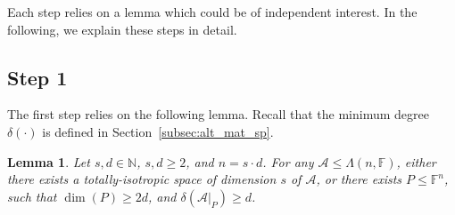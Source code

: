 \documentclass[10pt]{article}
\newtheorem{lemma}[theorem]{Lemma}
\newcommand{\spa}[1]{\mathcal{#1}}
\newcommand{\F}{\mathbb{F}}
\newcommand{\N}{\mathbb{N}}
\newcommand{\cA}{\spa{A}}
\begin{document}
Each step relies on a lemma which could be of independent interest. In the 
following, we explain these steps in detail.

\subsection{Step 1} 
%
%
The first step 
relies on the following lemma. 
Recall that the minimum degree $\delta(\cdot)$ is defined in 
Section~\ref{subsec:alt_mat_sp}.
\begin{lemma}\label{lem:iso_min-deg}
Let $s, d\in \N$, $s, d\geq 2$, and $n=s\cdot d$. For any $\cA\leq\Lambda(n, 
\F)$, either there exists a totally-isotropic space of 
dimension $s$ of $\cA$, or there exists $P\leq\F^n$, such that $\dim(P)\geq 2d$, 
and $\delta(\cA|_P)\geq 
d$. 
\end{lemma}
\end{document}
